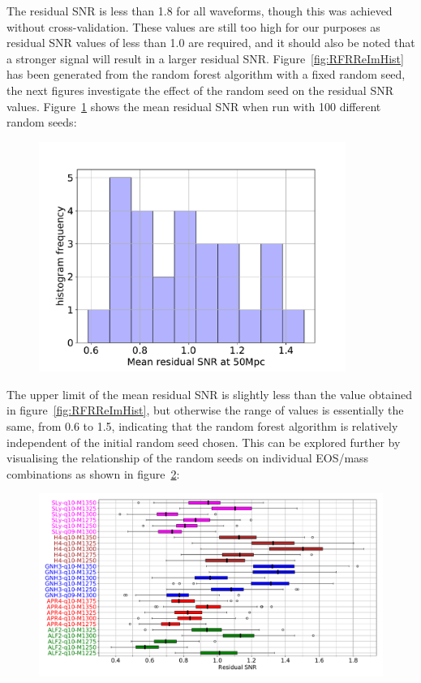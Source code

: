 The residual SNR is less than 1.8 for all waveforms, though this was achieved without cross-validation. These values are still too high for our purposes as residual SNR values of less than 1.0 are required, and it should also be noted that a stronger signal will result in a larger residual SNR. Figure~\ref{fig:RFRReImHist} has been generated from the random forest algorithm with a fixed random seed, the next figures investigate the effect of the random seed on the residual SNR values. Figure~\ref{fig:RFRRandomseed} shows the mean residual SNR when run with 100 different random seeds:
\begin{figure}[H]
	\centering
	\includegraphics[width=10cm]{./img/RFRRandomseed.pdf} 
	\caption[\protect]{\protect}
	\label{fig:RFRRandomseed}
\end{figure}
The upper limit of the mean residual SNR is slightly less than the value obtained in figure~\ref{fig:RFRReImHist}, but otherwise the range of values is essentially the same, from 0.6 to 1.5, indicating that the random forest algorithm is relatively independent of the initial random seed chosen. This can be explored further by visualising the relationship of the random seeds on individual EOS/mass combinations as shown in figure~\ref{fig:RFRresidualBoxEOSsorted}: 
\begin{figure}[H]
	\centering
	\includegraphics[width=15cm]{./img/RFRresidualBoxEOSsorted.pdf} 
	\caption[\protect]{\protect}
	\label{fig:RFRresidualBoxEOSsorted}
\end{figure}
